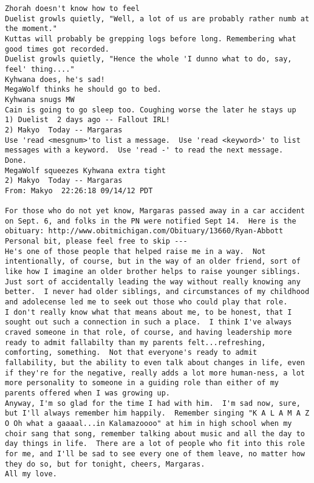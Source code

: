 \begin{verbatim}
Zhorah doesn't know how to feel
Duelist growls quietly, "Well, a lot of us are probably rather numb at the moment."
Kuttas will probably be grepping logs before long. Remembering what good times got recorded.
Duelist growls quietly, "Hence the whole 'I dunno what to do, say, feel' thing...."
Kyhwana does, he's sad!
MegaWolf thinks he should go to bed.
Kyhwana snugs MW
Cain is going to go sleep too. Coughing worse the later he stays up
1) Duelist  2 days ago -- Fallout IRL!
2) Makyo  Today -- Margaras
Use 'read <mesgnum>'to list a message.  Use 'read <keyword>' to list
messages with a keyword.  Use 'read -' to read the next message.
Done.
MegaWolf squeezes Kyhwana extra tight
2) Makyo  Today -- Margaras
From: Makyo  22:26:18 09/14/12 PDT

For those who do not yet know, Margaras passed away in a car accident on Sept. 6, and folks in the PN were notified Sept 14.  Here is the obituary: http://www.obitmichigan.com/Obituary/13660/Ryan-Abbott
Personal bit, please feel free to skip ---
He's one of those people that helped raise me in a way.  Not intentionally, of course, but in the way of an older friend, sort of like how I imagine an older brother helps to raise younger siblings.  Just sort of accidentally leading the way without really knowing any better.  I never had older siblings, and circumstances of my childhood and adolecense led me to seek out those who could play that role.
I don't really know what that means about me, to be honest, that I sought out such a connection in such a place.  I think I've always craved someone in that role, of course, and having leadership more ready to admit fallabilty than my parents felt...refreshing, comforting, something.  Not that everyone's ready to admit fallability, but the ability to even talk about changes in life, even if they're for the negative, really adds a lot more human-ness, a lot more personality to someone in a guiding role than either of my parents offered when I was growing up.
Anyway, I'm so glad for the time I had with him.  I'm sad now, sure, but I'll always remember him happily.  Remember singing "K A L A M A Z O Oh what a gaaaal...in Kalamazoooo" at him in high school when my choir sang that song, remember talking about music and all the day to day things in life.  There are a lot of people who fit into this role for me, and I'll be sad to see every one of them leave, no matter how they do so, but for tonight, cheers, Margaras.
All my love.


\end{verbatim}

